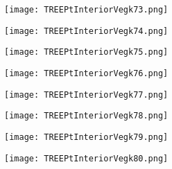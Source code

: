 \documentclass[pdf]{beamer}
\begin{document}
\begin{frame}
\begin{figure}[!h]
\centering
\texttt{[image: TREEPtInteriorVegk73.png]}
\end{figure}
\end{frame}

\begin{frame}
\begin{figure}[!h]
\centering
\texttt{[image: TREEPtInteriorVegk74.png]}
\end{figure}
\end{frame}

\begin{frame}
\begin{figure}[!h]
\centering
\texttt{[image: TREEPtInteriorVegk75.png]}
\end{figure}
\end{frame}

\begin{frame}
\begin{figure}[!h]
\centering
\texttt{[image: TREEPtInteriorVegk76.png]}
\end{figure}
\end{frame}

\begin{frame}
\begin{figure}[!h]
\centering
\texttt{[image: TREEPtInteriorVegk77.png]}
\end{figure}
\end{frame}

\begin{frame}
\begin{figure}[!h]
\centering
\texttt{[image: TREEPtInteriorVegk78.png]}
\end{figure}
\end{frame}

\begin{frame}
\begin{figure}[!h]
\centering
\texttt{[image: TREEPtInteriorVegk79.png]}
\end{figure}
\end{frame}

\begin{frame}
\begin{figure}[!h]
\centering
\texttt{[image: TREEPtInteriorVegk80.png]}
\end{figure}
\end{frame}
\end{document}
